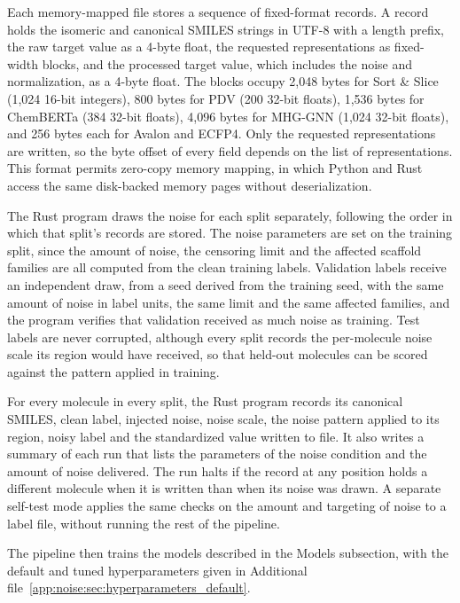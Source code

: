 Each memory-mapped file stores a sequence of fixed-format records. A record holds the isomeric and canonical SMILES strings in UTF-8 with a length prefix, the raw target value as a 4-byte float, the requested representations as fixed-width blocks, and the processed target value, which includes the noise and normalization, as a 4-byte float. The blocks occupy 2,048 bytes for Sort \& Slice (1,024 16-bit integers), 800 bytes for PDV (200 32-bit floats), 1,536 bytes for ChemBERTa (384 32-bit floats), 4,096 bytes for MHG-GNN (1,024 32-bit floats), and 256 bytes each for Avalon and ECFP4. Only the requested representations are written, so the byte offset of every field depends on the list of representations. This format permits zero-copy memory mapping, in which Python and Rust access the same disk-backed memory pages without deserialization.

The Rust program draws the noise for each split separately, following the order in which that
split's records are stored. The noise parameters are set on the training split, since the amount of
noise, the censoring limit and the affected scaffold families are all computed from the clean
training labels. Validation labels receive an independent draw, from a seed derived from the
training seed, with the same amount of noise in label units, the same limit and the same affected
families, and the program verifies that validation received as much noise as training. Test labels
are never corrupted, although every split records the per-molecule noise scale its region would
have received, so that held-out molecules can be scored against the pattern applied in training.

For every molecule in every split, the Rust program records its canonical SMILES, clean label,
injected noise, noise scale, the noise pattern applied to its region, noisy label and the
standardized value written to file. It also writes a summary of each run that lists the parameters
of the noise condition and the amount of noise delivered. The run halts if the record at any
position holds a different molecule when it is written than when its noise was drawn. A separate
self-test mode applies the same checks on the amount and targeting of noise to a label file,
without running the rest of the pipeline.

The pipeline then trains the models described in the Models subsection, with the default and tuned hyperparameters given in Additional file~\ref{app:noise:sec:hyperparameters_default}.

